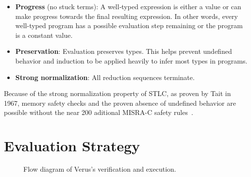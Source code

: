 \documentclass[conference]{IEEEtran}
\begin{document}
\begin{itemize}[nosep]
\item \textbf{Progress} (no stuck terms): A well‑typed expression is either a value or can make progress towards the final resulting expression. In other words, every well-typed program has a possible evaluation step remaining or the program is a constant value.
\item \textbf{Preservation}: Evaluation preserves types. This helps prevent undefined behavior and induction to be applied heavily to infer most types in programs.
\item \textbf{Strong normalization}: All reduction sequences terminate.
\end{itemize}

Because of the strong normalization property of STLC, as proven by Tait in 1967, memory safety checks and the proven absence of undefined behavior are possible without the near 200 aditional MISRA-C safety rules~\cite{tait1967}.

\section{Evaluation Strategy}


\begin{figure}[ht]
\centering
{}
\caption{Flow diagram of Verus's verification and execution.}
\label{fig:verus-pipeline}
\end{figure}
\end{document}
